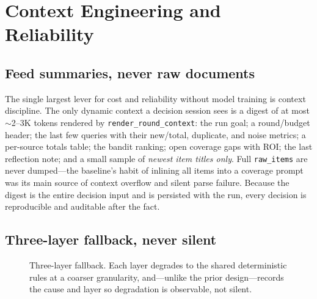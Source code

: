 \documentclass[conference]{IEEEtran}
\newcommand{\code}[1]{\texttt{\small #1}}
\begin{document}
\section{Context Engineering and Reliability}
\label{sec:context}

\subsection{Feed summaries, never raw documents}

The single largest lever for cost and reliability without model training is context discipline. The only dynamic context a decision session sees is a digest of at most $\sim$2--3K tokens rendered by \code{render\_round\_context}: the run goal; a round/budget header; the last few queries with their new/total, duplicate, and noise metrics; a per-source totals table; the bandit ranking; open coverage gaps with ROI; the last reflection note; and a small sample of \emph{newest item titles only}. Full \code{raw\_items} are never dumped---the baseline's habit of inlining all items into a coverage prompt was its main source of context overflow and silent parse failure. Because the digest is the entire decision input and is persisted with the run, every decision is reproducible and auditable after the fact.

\subsection{Three-layer fallback, never silent}

\begin{figure}[t]
\centering
{}
\caption{Three-layer fallback. Each layer degrades to the shared deterministic rules at a coarser granularity, and---unlike the prior design---records the cause and layer so degradation is observable, not silent.}
\label{fig:fallback}
\end{figure}
\end{document}
